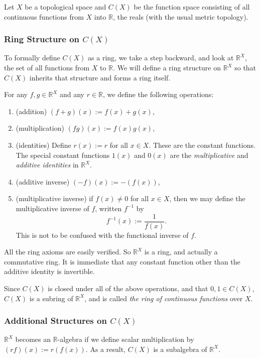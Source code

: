 \documentclass[12pt]{article}
\begin{document}
Let $X$ be a topological space and $C(X)$ be the function space consisting of all continuous functions from $X$ into $\mathbb{R}$, the reals (with the usual metric topology).

\subsubsection*{Ring Structure on $C(X)$}

To formally define $C(X)$ as a ring, we take a step backward, and look at $\mathbb{R}^X$, the set of all functions from $X$ to $\mathbb{R}$.  We will define a ring structure on $\mathbb{R}^X$ so that $C(X)$ inherits that structure and forms a ring itself.

For any $f,g\in \mathbb{R}^X$ and any $r\in\mathbb{R}$, we define the following operations:
\begin{enumerate}
\item (addition) $(f+g)(x):=f(x)+g(x)$,
\item (multiplication) $(fg)(x):=f(x)g(x)$,
\item (identities) Define $r(x):=r$ for all $x\in X$.  These are the constant functions.  The special constant functions $1(x)$ and $0(x)$ are the \emph{multiplicative} and \emph{additive identities} in $\mathbb{R}^X$.
\item (additive inverse) $(-f)(x):=-(f(x))$,
\item (multiplicative inverse) if $f(x)\ne 0$ for all $x\in X$, then we may define the multiplicative inverse of $f$, written $f^{-1}$ by $$f^{-1}(x):=\frac{1}{f(x)}.$$ This is not to be confused with the functional inverse of $f$.
\end{enumerate}

All the ring axioms are easily verified.  So $\mathbb{R}^X$ is a ring, and actually a commutative ring.  It is immediate that any constant function other than the additive identity is invertible.

Since $C(X)$ is closed under all of the above operations, and that $0,1\in C(X)$, $C(X)$ is a subring of $\mathbb{R}^X$, and is called \emph{the ring of continuous functions} over $X$.

\subsubsection*{Additional Structures on $C(X)$}

$\mathbb{R}^X$ becomes an $\mathbb{R}$-algebra if we define scalar multiplication by $(rf)(x):=r(f(x))$.  As a result, $C(X)$ is a subalgebra of $\mathbb{R}^X$.
\end{document}

